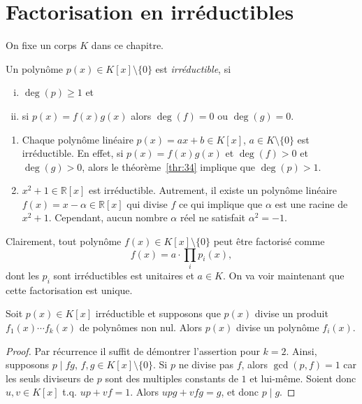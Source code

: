 \section{Factorisation en irréductibles}
\label{sec:fact-en-irred}

On fixe un corps $K$ dans ce chapitre. 

\begin{definition}
  \label{def:53}
  Un polynôme $p(x) ∈ K[x] \setminus \{0\}$ est \emph{irréductible}, si
  \begin{enumerate}[i)]
  \item $\deg(p) ≥1$ et
  \item  si $p(x) = f(x) g(x)$ alors $\deg(f) = 0$ ou $\deg(g) = 0$. 
  \end{enumerate}
\end{definition}

\begin{example}
  \label{exe:46}
  \begin{enumerate}
  \item   Chaque polynôme linéaire $p(x) = ax + b ∈ K[x]$, $a ∈ K \setminus\{0\}$ est irréductible. En effet, si $p(x) = f(x) g(x)$ et $\deg(f)>0$ et $\deg(g)>0$, alors le théorème~\ref{thr:34} implique que $\deg(p) >1$.
  \item $x^2 +1 ∈ℝ[x]$ est irréductible. Autrement, il existe un polynôme linéaire $f(x) =  x - α ∈ ℝ[x]$ qui divise $f$ ce qui implique que $α$ est une racine de $x^2 +1$. Cependant, aucun nombre $α$ réel ne satisfait $α^2 = -1$.
  \end{enumerate}
\end{example}


Clairement, tout polynôme $f(x) ∈ K[x] \setminus \{0\}$    peut être factorisé comme
\begin{equation}
  \label{eq:33}
  f(x) = a ⋅ ∏_i p_i(x),
\end{equation}
dont les $p_i$ sont irréductibles est unitaires et $a ∈ K$. On va voir maintenant que cette factorisation est unique. 

\begin{theorem}
\label{thr:56}
  Soit $p(x) ∈K[x]$ irréductible et supposons que $p(x)$ divise un produit $f_1(x) \cdots f_k(x)$ de polynômes non nul. Alors $p(x)$ divise un polynôme $f_i(x)$. 
\end{theorem}


\begin{proof}
  Par récurrence il suffit de démontrer l'assertion pour $k=2$. Ainsi, supposons $p \mid fg$, $f,g ∈K[x] \setminus \{0\}$. Si $p$ ne divise pas $f$, alors $\gcd(p,f) = 1$ car les seuls diviseurs de $p$ sont des multiples constants de $1$ et lui-même. Soient donc $u,v ∈ K[x]$ t.q.  $up + vf = 1$. Alors $upg + vfg = g$, et donc $p \mid g$. 
\end{proof}


